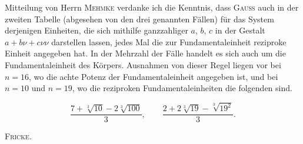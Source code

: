  Mitteilung von Herrn \textsc{Mehmke} verdanke ich die Kenntnis, dass \textsc{Gauss} auch in der
zweiten Tabelle (abgesehen von den drei genannten Fällen) für das System
derjenigen Einheiten, die sich mithilfe ganzzahliger $a$, $b$, $c$ in der
Gestalt $a+b\nu+c\nu\nu$ darstellen lassen, jedes Mal die zur
Fundamentaleinheit reziproke Einheit angegeben hat. In der Mehrzahl der
Fälle handelt es sich auch um die Fundamentaleinheit des Körpers.
Ausnahmen von dieser Regel liegen vor bei $n=16$, wo die achte Potenz der
Fundamentaleinheit angegeben ist, und bei $n=10$ und $n=19$, wo die
reziproken Fundamentaleinheiten die folgenden sind.

\[
\frac{7+\sqrt[3]{10}-2\sqrt[3]{100}}{3}, \qquad
\frac{2+2\sqrt[3]{19}-\sqrt[3]{19^2}}{3}.
\]

\par\noindent\hfill\textsc{Fricke.}\par\endgroup
